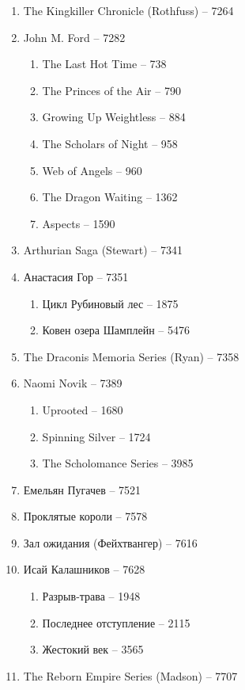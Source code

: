 \documentclass[a4paper, 11pt]{proc} %
\begin{document}
\begin{enumerate}
    \item The Kingkiller Chronicle (Rothfuss) -- 7264
    \item John M. Ford -- 7282
        \begin{enumerate}
            \item The Last Hot Time -- 738
            \item The Princes of the Air -- 790
            \item Growing Up Weightless -- 884
            \item The Scholars of Night -- 958
            \item Web of Angels -- 960
            \item The Dragon Waiting -- 1362
            \item Aspects -- 1590
        \end{enumerate}
    \item Arthurian Saga (Stewart) -- 7341
    \item Анастасия Гор -- 7351
        \begin{enumerate}
            \item Цикл Рубиновый лес -- 1875
            \item Ковен озера Шамплейн -- 5476
        \end{enumerate}
    \item The Draconis Memoria Series (Ryan) -- 7358
    \item Naomi Novik -- 7389
        \begin{enumerate}
            \item Uprooted -- 1680
            \item Spinning Silver -- 1724
            \item The Scholomance Series -- 3985
        \end{enumerate}
    \item Емельян Пугачев -- 7521
    \item Проклятые короли -- 7578
    \item Зал ожидания (Фейхтвангер) -- 7616
    \item Исай Калашников -- 7628
        \begin{enumerate}
            \item Разрыв-трава -- 1948
            \item Последнее отступление -- 2115
            \item Жестокий век -- 3565
        \end{enumerate}
    \item The Reborn Empire Series (Madson) -- 7707

\end{enumerate}
\end{document}
